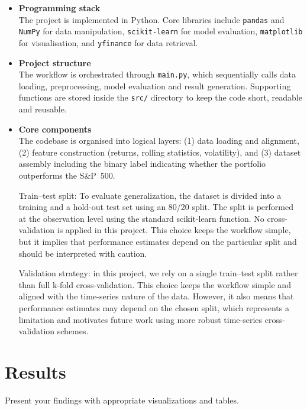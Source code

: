 \documentclass[11pt,a4paper]{article}
\begin{document}
\begin{itemize}

\item \textbf{Programming stack} \\
The project is implemented in Python. Core libraries include \texttt{pandas} and \texttt{NumPy} for data manipulation, \texttt{scikit-learn} for model evaluation, \texttt{matplotlib} for visualisation, and \texttt{yfinance} for data retrieval.

\item \textbf{Project structure} \\
The workflow is orchestrated through \texttt{main.py}, which sequentially calls data loading, preprocessing, model evaluation and result generation. Supporting functions are stored inside the \texttt{src/} directory to keep the code short, readable and reusable.

\item \textbf{Core components} \\
The codebase is organised into logical layers: (1) data loading and alignment, (2) feature construction (returns, rolling statistics, volatility), and (3) dataset assembly including the binary label indicating whether the portfolio outperforms the S\&P~500.

Train–test split: To evaluate generalization, the dataset is divided into a training and a hold-out test set using an 80/20 split. The split is performed at the observation level using the standard scikit-learn function. No cross-validation is applied in this project. This choice keeps the workflow simple, but it implies that performance estimates depend on the particular split and should be interpreted with caution.

Validation strategy: in this project, we rely on a single train–test split rather than full k-fold cross-validation. This choice keeps the workflow simple and aligned with the time-series nature of the data. However, it also means that performance estimates may depend on the chosen split, which represents a limitation and motivates future work using more robust time-series cross-validation schemes.

\end{itemize}


\section{Results}
\label{sec:results}

Present your findings with appropriate visualizations and tables.
\end{document}
